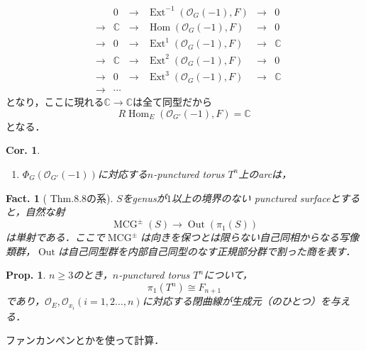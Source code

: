 \documentclass[uplatex,a4paper,11pt,dvipdfmx]{jsarticle}
\makeatletter
\theoremstyle{mystyle} %
\newtheorem{proposition}[theorem]{Prop.}
\newtheorem{corollary}[theorem]{Cor.}
\newtheorem{fact}[theorem]{Fact.}
\renewenvironment{proof}[1][\proofname]{\par
 \pushQED{\qed}%
 \normalfont \topsep6\p@\@plus6\p@\relax
 \trivlist
 \item[\hskip\labelsep
 \itshape
 {\bf\underline{#1}}]\ignorespaces
}{%
 \popQED\endtrivlist\@endpefalse
}
\DeclareMathOperator{\Hom}{Hom}
\DeclareMathOperator{\Ext}{Ext}
\DeclareMathOperator{\MCG}{MCG}
\DeclareMathOperator{\Out}{Out}
\makeatother
\begin{document}
\begin{proof}
\begin{enumerate}
\[\begin{array}{ccccccc}
				       &     & 0          & \to & \Ext^{-1}(\mathcal{O}_G(-1), F) & \to & 0          \\
				       & \to & \mathbb{C} & \to & \Hom(\mathcal{O}_G(-1), F)      & \to & 0          \\
				       & \to & 0          & \to & \Ext^1(\mathcal{O}_G(-1),F)     & \to & \mathbb{C} \\
				       & \to & \mathbb{C} & \to & \Ext^2(\mathcal{O}_G(-1),F)     & \to & 0          \\
				       & \to & 0          & \to & \Ext^3(\mathcal{O}_G(-1),F)     & \to & \mathbb{C} \\
				       & \to & \cdots     &     &                                 &
			      \end{array}
		      \]となり，ここに現れる$\mathbb{C}\to \mathbb{C}$は全て同型だから$$R\Hom_E(\mathcal{O}_{G'}(-1), F) = \mathbb{C}$$となる．
	\end{enumerate}
\end{proof}

\begin{corollary}
	\begin{enumerate}
		\item $\Phi_G(\mathcal{O}_{G'}(-1))$に対応する$n$-punctured torus $T^n$上のarcは，

	\end{enumerate}

\end{corollary}

\begin{fact}[\cite{BD11} Thm.8.8の系]\label{action_on_pi1}
	$S$をgenusが$1$以上の境界のない punctured surfaceとすると，自然な射
	$$\MCG^\pm(S) \to \Out(\pi_1(S))$$は単射である．ここで$\MCG^\pm$は向きを保つとは限らない自己同相からなる写像類群，$\Out$は自己同型群を内部自己同型のなす正規部分群で割った商を表す．
\end{fact}
\begin{proposition}\label{gen_of_pi1}
	$n \geq 3$のとき，$n$-punctured torus $T^n$について，$$\pi_1(T^n) \cong F_{n+1}$$であり，$\mathcal{O}_E, \mathcal{O}_{x_i}(i=1,2 \dots, n)$に対応する閉曲線が生成元（のひとつ）を与える．
\end{proposition}
\begin{proof}
	ファンカンペンとかを使って計算．
\end{proof}
\end{document}
